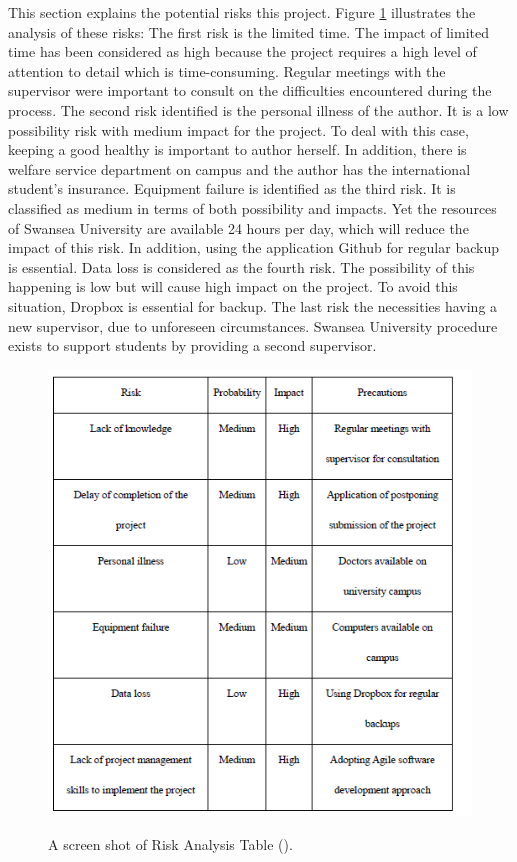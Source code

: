 This section explains the potential risks this project.
Figure \ref{fig:riskAnalysis} illustrates the analysis of these risks: The first risk is the limited time. The impact of limited time has been considered as high because the project requires a high level of attention to detail which is time-consuming. Regular meetings with the supervisor were important to consult on the difficulties encountered during the process. The second risk identified is the personal illness of the author. It is a low possibility risk with medium impact for the project. To deal with this case, keeping a good healthy is important to author herself. In addition, there is welfare service department on campus and the author has the international student’s insurance. Equipment failure is identified as the third risk. It is classified as medium in terms of both possibility and impacts. Yet the resources of  Swansea University are available 24 hours per day, which will reduce the impact of this risk. In addition, using the application Github for regular backup is essential. Data loss is considered as the fourth risk. The possibility of this happening is low but will cause high impact on the project. To avoid this situation, Dropbox is essential for backup. The last risk the necessities having a new supervisor, due to unforeseen circumstances. Swansea University procedure exists to support students by providing a second supervisor. 

\begin{figure}[H]
	\centering    
	\includegraphics[scale=0.8]{Figs/Risk-Analysis}\\[1ex]
	\caption{A screen shot of Risk Analysis Table (\cite{Liu}). }
	\label{fig:riskAnalysis}
\end{figure}

